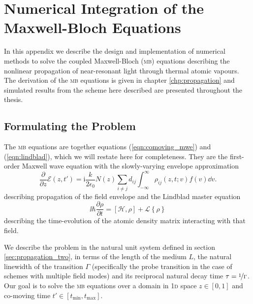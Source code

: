 \chapter[Numerical Integration of the Maxwell-Bloch Equations]
  {Numerical Integration of the\\ Maxwell-Bloch Equations}
  \label{apx:mb_eqns}


    In this appendix we describe the design and implementation of numerical
    methods to solve the coupled Maxwell-Bloch (\textsc{mb}) equations
    describing the nonlinear propagation of near-resonant light through thermal
    atomic vapours. The derivation of the \textsc{mb} equations is given in
    chapter \ref{chp:propagation} and simulated results from the scheme here
    described are presented throughout the thesis.

  \section{Formulating the Problem}

    The \textsc{mb} equations are together equations (\ref{eqn:comoving_mwe})
    and (\ref{eqn:lindblad}), which we will restate here for completeness. They
    are the first-order Maxwell wave equation with the slowly-varying envelope
    approximation
    \begin{equation*}
      \frac{\partial}{\partial z} \mathcal{E}(z,t') = 
        \mathrm{i} \frac{k}{2 \epsilon_0}
        N(z) \sum_{i \ne j} d_{ij} \int_{-\infty}^{\infty} 
          \rho_{ij}(z,t; v) f(v) {\dd v}. 
    \end{equation*}
    describing propagation of the field envelope and the Lindblad master
    equation
    \begin{equation*}
      \ii \hbar \frac{\partial \rho}{\partial t} = [\mathcal{H}, \rho] + 
        \mathcal{L}\left\{ \rho \right\}
    \end{equation*}
    describing the time-evolution of the atomic density matrix interacting with
    that field.

    We describe the problem in the natural unit system defined in section
    \ref{sec:propagation_two}, in terms of the length of the medium $L$, the
    natural linewidth of the transition $\Gamma$ (specifically the probe
    transition in the case of schemes with multiple field modes) and its
    reciprocal natural decay time $\tau = \nicefrac{1}{\Gamma}$. Our goal is to
    solve the \textsc{mb} equations over a domain in \textsc{1d} space $z \in
    [0, 1]$ and co-moving time $t' \in [t_{\mathrm{min}}, t_{\mathrm{max}}]$.

